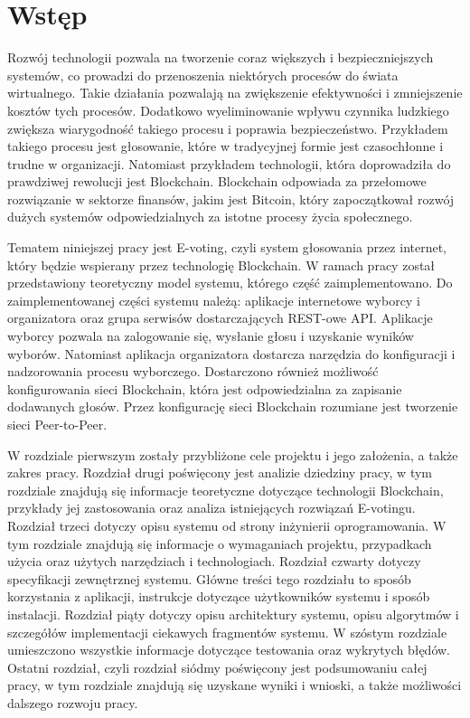 \documentclass[a4paper,12pt]{book}
\begin{document}
\chapter{Wstęp}

Rozwój technologii pozwala na tworzenie coraz większych i bezpieczniejszych systemów, co prowadzi do przenoszenia niektórych procesów do świata wirtualnego. Takie działania pozwalają na zwiększenie efektywności i zmniejszenie kosztów tych procesów. Dodatkowo wyeliminowanie wpływu czynnika ludzkiego zwiększa wiarygodność takiego procesu i poprawia bezpieczeństwo. Przykładem takiego procesu jest głosowanie, które w tradycyjnej formie jest czasochłonne i trudne w organizacji. Natomiast przykładem technologii, która doprowadziła do prawdziwej rewolucji jest Blockchain. Blockchain odpowiada za przełomowe rozwiązanie w sektorze finansów, jakim jest Bitcoin, który zapoczątkował rozwój dużych systemów odpowiedzialnych za istotne procesy życia społecznego.

Tematem niniejszej pracy jest E-voting, czyli system głosowania przez internet, który będzie wspierany przez technologię Blockchain. W ramach pracy został przedstawiony teoretyczny model systemu, którego część zaimplementowano. Do zaimplementowanej części systemu należą: aplikacje internetowe wyborcy i organizatora oraz grupa serwisów dostarczających REST-owe API. Aplikacje wyborcy pozwala na zalogowanie się, wysłanie głosu i uzyskanie wyników wyborów. Natomiast aplikacja organizatora dostarcza narzędzia do konfiguracji i nadzorowania procesu wyborczego. Dostarczono również możliwość konfigurowania sieci Blockchain, która jest odpowiedzialna za zapisanie dodawanych głosów. Przez konfigurację sieci Blockchain rozumiane jest tworzenie sieci Peer-to-Peer.

W rozdziale pierwszym zostały przybliżone cele projektu i jego założenia, a także zakres pracy. Rozdział drugi poświęcony jest analizie dziedziny pracy, w tym rozdziale znajdują się informacje teoretyczne dotyczące technologii Blockchain, przykłady jej zastosowania oraz analiza istniejących rozwiązań E-votingu. Rozdział trzeci dotyczy opisu systemu od strony inżynierii oprogramowania. W tym rozdziale znajdują się informacje o wymaganiach projektu, przypadkach użycia oraz użytych narzędziach i technologiach. Rozdział czwarty dotyczy specyfikacji zewnętrznej systemu. Główne treści tego rozdziału to sposób korzystania z aplikacji, instrukcje dotyczące użytkowników systemu i sposób instalacji. Rozdział piąty dotyczy opisu architektury systemu, opisu algorytmów i szczegółów implementacji ciekawych fragmentów systemu. W szóstym rozdziale umieszczono wszystkie informacje dotyczące testowania oraz wykrytych błędów.
Ostatni rozdział, czyli rozdział siódmy poświęcony jest podsumowaniu całej pracy, w tym rozdziale znajdują się uzyskane wyniki i wnioski, a także możliwości dalszego rozwoju pracy.
\end{document}
